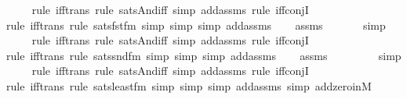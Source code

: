 \begin{isabellebody}
\ \ \ \ \isamarkupfalse%
{\isacharparenleft}{\kern0pt}rule\ iff{\isacharunderscore}{\kern0pt}trans{\isacharcomma}{\kern0pt}\ rule\ sats{\isacharunderscore}{\kern0pt}And{\isacharunderscore}{\kern0pt}iff{\isacharcomma}{\kern0pt}\ simp\ add{\isacharcolon}{\kern0pt}assms{\isacharcomma}{\kern0pt}\ rule\ iff{\isacharunderscore}{\kern0pt}conjI{}{\isacharparenright}{\kern0pt}\isanewline
\ \ \ \ \ \isamarkupfalse%
{\isacharparenleft}{\kern0pt}rule\ iff{\isacharunderscore}{\kern0pt}trans{\isacharcomma}{\kern0pt}\ rule\ sats{\isacharunderscore}{\kern0pt}fst{\isacharunderscore}{\kern0pt}fm{\isacharcomma}{\kern0pt}\ simp{\isacharcomma}{\kern0pt}\ simp{\isacharcomma}{\kern0pt}\ simp\ add{\isacharcolon}{\kern0pt}assms{\isacharparenright}{\kern0pt}\isanewline
\ \ \isamarkupfalse%
\ assms\isanewline
\ \ \ \ \ \isamarkupfalse%
\ simp\isanewline
\ \ \ \ \isamarkupfalse%
{\isacharparenleft}{\kern0pt}rule\ iff{\isacharunderscore}{\kern0pt}trans{\isacharcomma}{\kern0pt}\ rule\ sats{\isacharunderscore}{\kern0pt}And{\isacharunderscore}{\kern0pt}iff{\isacharcomma}{\kern0pt}\ simp\ add{\isacharcolon}{\kern0pt}assms{\isacharcomma}{\kern0pt}\ rule\ iff{\isacharunderscore}{\kern0pt}conjI{}{\isacharparenright}{\kern0pt}\isanewline
\ \ \ \ \ \isamarkupfalse%
{\isacharparenleft}{\kern0pt}rule\ iff{\isacharunderscore}{\kern0pt}trans{\isacharcomma}{\kern0pt}\ rule\ sats{\isacharunderscore}{\kern0pt}snd{\isacharunderscore}{\kern0pt}fm{\isacharcomma}{\kern0pt}\ simp{\isacharcomma}{\kern0pt}\ simp{\isacharcomma}{\kern0pt}\ simp\ add{\isacharcolon}{\kern0pt}assms{\isacharparenright}{\kern0pt}\isanewline
\ \ \isamarkupfalse%
\ assms\ \ \isanewline
\ \ \ \ \ \isamarkupfalse%
\ simp\isanewline
\ \ \ \ \isamarkupfalse%
{\isacharparenleft}{\kern0pt}rule\ iff{\isacharunderscore}{\kern0pt}trans{\isacharcomma}{\kern0pt}\ rule\ sats{\isacharunderscore}{\kern0pt}And{\isacharunderscore}{\kern0pt}iff{\isacharcomma}{\kern0pt}\ simp\ add{\isacharcolon}{\kern0pt}assms{\isacharcomma}{\kern0pt}\ rule\ iff{\isacharunderscore}{\kern0pt}conjI{}{\isacharparenright}{\kern0pt}\isanewline
\ \ \ \ \ \isamarkupfalse%
{\isacharparenleft}{\kern0pt}rule\ iff{\isacharunderscore}{\kern0pt}trans{\isacharcomma}{\kern0pt}\ rule\ sats{\isacharunderscore}{\kern0pt}least{\isacharunderscore}{\kern0pt}fm{\isacharcomma}{\kern0pt}\ simp{\isacharcomma}{\kern0pt}\ simp{\isacharcomma}{\kern0pt}\ simp\ add{\isacharcolon}{\kern0pt}assms{\isacharcomma}{\kern0pt}\ simp\ add{\isacharcolon}{\kern0pt}zero{\isacharunderscore}{\kern0pt}in{\isacharunderscore}{\kern0pt}M{\isacharparenright}{\kern0pt}\ \isanewline

\end{isabellebody}
